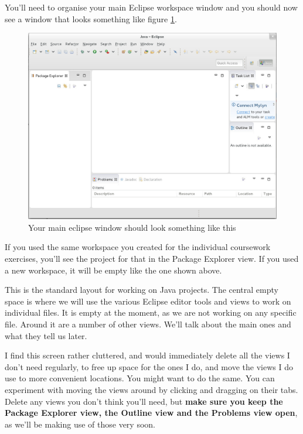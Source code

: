 \documentclass[
]{book}
\begin{document}
You'll need to organise your main Eclipse workspace window and you should now see a window that looks something like figure \ref{fig:firstview-fig}.

\begin{figure}

{\centering \includegraphics[width=1\linewidth]{images/1.3.2firstView} 

}

\caption{Your main eclipse window should look something like this}\label{fig:firstview-fig}
\end{figure}

If you used the same workspace you created for the individual coursework exercises, you'll see the project for that in the Package Explorer view. If you used a new workspace, it will be empty like the one shown above.

This is the standard layout for working on Java projects. The central empty space is where we will use the various Eclipse editor tools and views to work on individual files. It is empty at the moment, as we are not working on any specific file. Around it are a number of other views. We'll talk about the main ones and what they tell us later.

I find this screen rather cluttered, and would immediately delete all the views I don't need regularly, to free up space for the ones I do, and move the views I do use to more convenient locations. You might want to do the same. You can experiment with moving the views around by clicking and dragging on their tabs. Delete any views you don't think you'll need, but \textbf{make sure you keep the Package Explorer view, the Outline view and the Problems view open}, as we'll be making use of those very soon.
\end{document}
